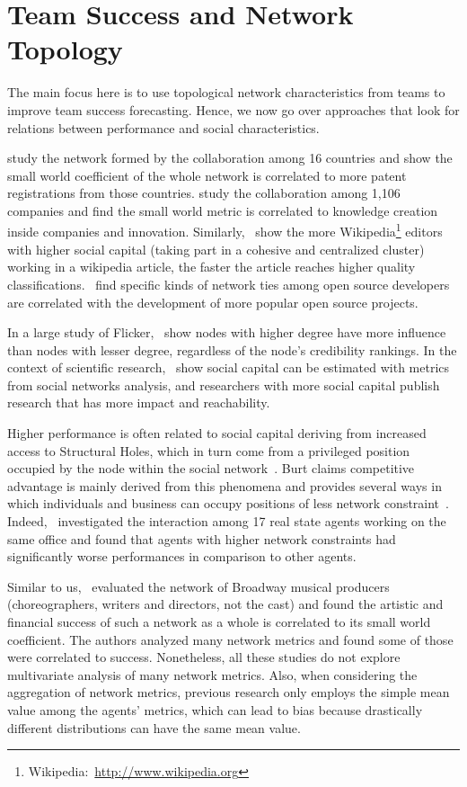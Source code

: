 \section{Team Success and Network Topology}
\label{sec:closely}
The main focus here is to use topological network characteristics from teams to
improve team success forecasting. Hence, we now go over approaches that look
for relations between performance and social characteristics.

\cite{chen2010impact} study the network formed by the collaboration among 16
countries and show the small world coefficient of the whole network is
correlated to more patent registrations from those countries.
\cite{schilling2007interfirm} study the collaboration among 1,106 companies and
find the small world metric is correlated to knowledge creation inside
companies and innovation. Similarly,~\cite{nemoto2011social} show the more
Wikipedia\footnote{Wikipedia:~\url{http://www.wikipedia.org}} editors with
higher social capital (taking part in a cohesive and centralized cluster)
working in a wikipedia article, the faster the article reaches higher quality
classifications.~\cite{singh2011network} find specific kinds of network ties
among open source developers are correlated with the development of more
popular open source projects.

In a large study of Flicker,~\cite{PapagelisMZ11} show nodes with higher degree
have more influence than nodes with lesser degree, regardless of the node's
credibility rankings. In the context of scientific research,~\cite{LiLY2013}
show social capital can be estimated with metrics from social networks
analysis, and researchers with more social capital publish research that has
more impact and reachability.

Higher performance is often related to social capital deriving from increased
access to Structural Holes, which in turn come from a privileged position
occupied by the node within the social network~\cite{Burt04,burt2005brokerage}.
Burt claims competitive advantage is mainly derived from this phenomena and
provides several ways in which individuals and business can occupy positions of
less network constraint~\citep{burt2009structural}. Indeed,~\cite{Rebehy2013}
investigated the interaction among 17 real state agents working on the same
office and found that agents with higher network constraints had significantly
worse performances in comparison to other agents.

Similar to us,~\cite{uzzi2005collaboration} evaluated the network of Broadway
musical producers (choreographers, writers and directors, not the cast) and
found the artistic and financial success of such a network as a whole is
correlated to its small world coefficient. The authors analyzed many network
metrics and found some of those were correlated to success. Nonetheless, all
these studies do not explore multivariate analysis of many network metrics.
Also, when considering the aggregation of network metrics, previous research
only employs the simple mean value among the agents' metrics, which can lead to
bias because drastically different distributions can have the same mean value.

